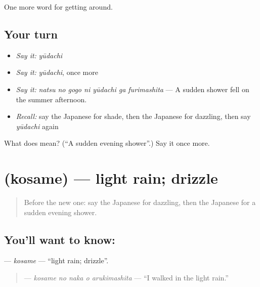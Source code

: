 \begin{grammarlens}[title={What you've built}]
One more word for getting around.
\end{grammarlens}

\subsection*{Your turn}
\begin{itemize}
\raggedright
  \item \emph{Say it:} \emph{yūdachi}
  \item \emph{Say it:} \emph{yūdachi}, once more
  \item \emph{Say it:} \emph{natsu no gogo ni yūdachi ga furimashita} — A sudden shower fell on the summer afternoon.
  \item \emph{Recall:} say the Japanese for shade, then the Japanese for dazzling, then say \emph{yūdachi} again
\end{itemize}

\begin{tcolorbox}[breakable,colback=teal!4,colframe=teal!35!black,title={Before you move on}]
What does  mean? (\textquotedblleft{}A sudden evening shower\textquotedblright{}.) Say it once more.
\end{tcolorbox}
\section[\texorpdfstring{\ja{こさめ} (kosame)}{こさめ (kosame)}]{ (kosame) — light rain; drizzle}

\label{lesson:JA-C415-kosame}



\begin{quote}
Before the new one: say the Japanese for dazzling, then the Japanese for a sudden evening shower.
\end{quote}

\subsection*{You'll want to know: }
\textbf{} — \emph{kosame} — \textquotedblleft{}light rain; drizzle\textquotedblright{}.

\begin{quote}
\textbf{  } — \emph{kosame no naka o arukimashita} — \textquotedblleft{}I walked in the light rain.\textquotedblright{}
\end{quote}

